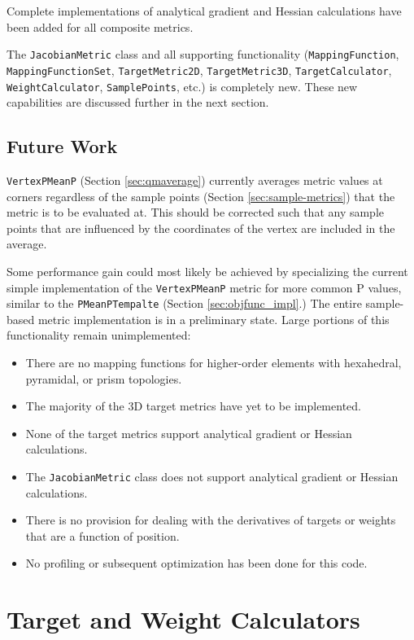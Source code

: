 \documentclass{article}
\begin{document}
Complete implementations of analytical gradient and Hessian calculations have been added for all composite metrics.  

The \texttt{JacobianMetric} class and all supporting functionality (\texttt{MappingFunction}, \texttt{MappingFunctionSet}, \texttt{TargetMetric2D}, \texttt{TargetMetric3D}, \texttt{TargetCalculator}, \texttt{WeightCalculator},
\texttt{SamplePoints}, etc.) is completely new.  These new capabilities are discussed further in the next section.


\subsection{Future Work}

 \texttt{VertexPMeanP} (Section \ref{sec:qmaverage}) currently averages metric values at corners regardless of the sample points (Section \ref{sec:sample-metrics}) that the metric is to be evaluated at.  This should be corrected such that any sample points that are influenced by the coordinates of the vertex are included in the average.
 
Some performance gain could most likely be achieved by specializing the current simple implementation of the \texttt{VertexPMeanP} metric for more common P values, similar to the \texttt{PMeanPTempalte} (Section \ref{sec:objfunc_impl}.) 
The entire sample-based metric implementation is in a preliminary state.  Large portions of this functionality remain unimplemented:
\begin{itemize}
\item There are no mapping functions for higher-order elements with hexahedral, pyramidal, or prism topologies.
\item The majority of the 3D target metrics have yet to be implemented.
\item None of the target metrics support analytical gradient or Hessian calculations.
\item The \texttt{JacobianMetric} class does not support analytical gradient or Hessian calculations.
\item There is no provision for dealing with the derivatives of targets or weights that are a function of position.
\item No profiling or subsequent optimization has been done for this code.
\end{itemize}

\section{Target and Weight Calculators}
\end{document}
